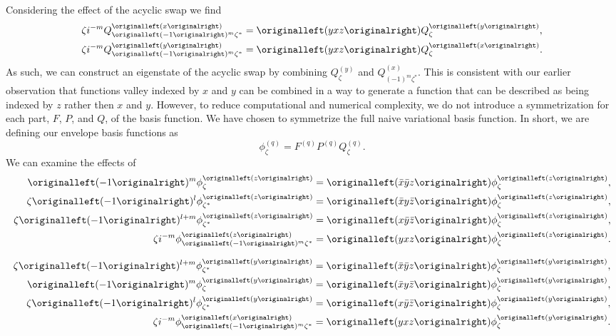 Considering the effect of the acyclic swap we find 
\begin{align}
  \zeta\im^{-m}Q_{\left(-1\right)^{m}\zeta^{*}}^{\left(x\right)}
  & =
    \left(yxz\right)
    Q_{\zeta}^{\left(y\right)},
  \\
  \zeta\im^{-m}Q_{\left(-1\right)^{m}\zeta^{*}}^{\left(y\right)}
  & =
    \left(yxz\right)
    Q_{\zeta}^{\left(x\right)}.
\end{align}
As such, we can construct an eigenstate of the acyclic swap by combining $Q_{
\zeta }^{ \left(y\right) }$ and $Q_{ \left(-1\right)^m \zeta^{*} }^{
\left(x\right) }$. This is consistent with our earlier observation that
functions valley indexed by $x$ and $y$ can be combined in a way to generate a
function that can be described as being indexed by $z$ rather then $x$ and $y$.
However, to reduce computational and numerical complexity, we do not introduce a
symmetrization for each part, $F$, $P$, and $Q$, of the basis function. We have
chosen to symmetrize the full naive variational basis function. In short, we are
defining our envelope basis functions as 
\begin{equation}
    \phi_{ \zeta }^{\left(q\right)}
    =
    F^{\left(q\right)}P^{\left(q\right)}Q_{ \zeta }^{\left(q\right)}.
\end{equation}
We can examine the effects of 
\begin{align}
  \left(-1\right)^{m}
  \phi_{ \zeta }^{\left(z\right)}
  & =
      \left(\bar{x}\bar{y}z\right)
      \phi_{ \zeta }^{\left(z\right)},
\label{dblinv:z-state:z}
\\
  \zeta\left(-1\right)^{l}
  \phi_{ \zeta^{*} }^{\left(z\right)}
  & =
      \left(\bar{x}y\bar{z}\right)
      \phi_{ \zeta }^{\left(z\right)},
\label{dblinv:y-state:z}
\\
  \zeta\left(-1\right)^{l+m}
  \phi_{ \zeta^{*} }^{\left(z\right)}
  & =
      \left(x\bar{y}\bar{z}\right)
      \phi_{ \zeta }^{\left(z\right)},
\label{dblinv:x-state:z}
\\
  \zeta\im^{-m}
  \phi_{ \left(-1\right)^{m}\zeta^{*} }^{\left(z\right)}
  & =
      \left(yxz\right)
      \phi_{ \zeta }^{\left(z\right)}.
\label{acyc:z-state:z}
\end{align}

\begin{align}
  \zeta\left(-1\right)^{l+m}
  \phi_{ \zeta^{*} }^{\left(y\right)}
  & =
      \left(\bar{x}\bar{y}z\right)
      \phi_{ \zeta }^{\left(y\right)},
\label{dblinv:z-state:y}
\\
  \left(-1\right)^{m}
  \phi_{ \zeta }^{\left(y\right)}
  & =
      \left(\bar{x}y\bar{z}\right)
      \phi_{ \zeta }^{\left(y\right)},
\label{dblinv:y-state:y}
\\
  \zeta\left(-1\right)^{l}
  \phi_{ \zeta^{*} }^{\left(y\right)}
  & =
      \left(x\bar{y}\bar{z}\right)
      \phi_{ \zeta }^{\left(y\right)},
\label{dblinv:x-state:y}
\\
  \zeta\im^{-m}
  \phi_{ \left(-1\right)^{m}\zeta^{*} }^{\left(x\right)}
  & =
      \left(yxz\right)
      \phi_{ \zeta }^{\left(y\right)}.
\label{acyc:z-state:y}
\end{align}
    
